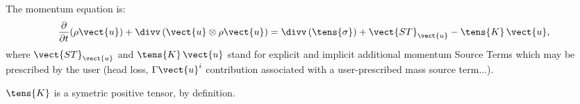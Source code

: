 The momentum equation is:
\begin{equation}\label{eq:momentum}
\dfrac{\partial }{\partial t}(\rho \vect{u})
+\divv \left( \vect{u}\otimes \rho \vect{u} \right)
=\divv \left( \tens{\sigma} \right) +\vect{ST}_{\vect{u}}-\tens{K}\,\vect{u},
\end{equation}
where $\vect{ST}_{\vect{u}}$ and $\tens{K}\,\vect{u}$ stand for explicit and implicit additional 
momentum Source Terms
 which may be prescribed by the user (head loss, $\Gamma \vect{u}^{i}$ 
contribution associated with a user-prescribed mass source term...).

$\tens{K}$ is a symetric positive tensor, by definition. 

